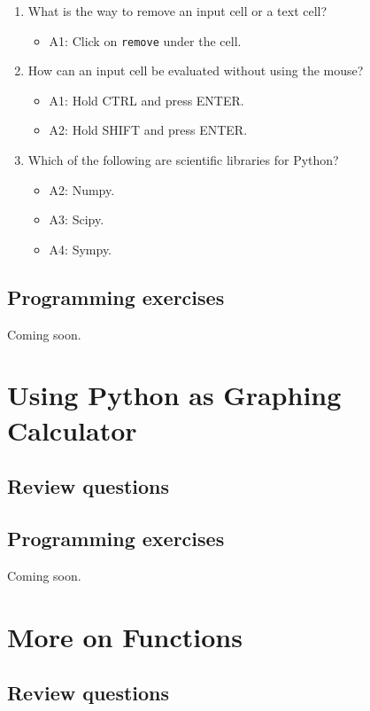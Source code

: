 \documentclass[article,A4,12pt]{llncs}
\begin{document}
\begin{enumerate}
\begin{itemize}
  \end{itemize}
\item What is the way to remove an input cell or a text cell?
  \begin{itemize}
    \item A1: Click on {\tt remove} under the cell. 
  \end{itemize}
\item How can an input cell be evaluated without using the mouse?
  \begin{itemize}
    \item A1: Hold CTRL and press ENTER.
    \item A2: Hold SHIFT and press ENTER.
  \end{itemize}
\item Which of the following are scientific libraries for Python?
  \begin{itemize}
    \item A2: Numpy.
    \item A3: Scipy.
    \item A4: Sympy.
  \end{itemize}
\end{enumerate}

\subsection{Programming exercises}

Coming soon.


\section{Using Python as Graphing Calculator}

\subsection{Review questions}

\subsection{Programming exercises}

Coming soon.


\section{More on Functions}

\subsection{Review questions}
\end{document}
